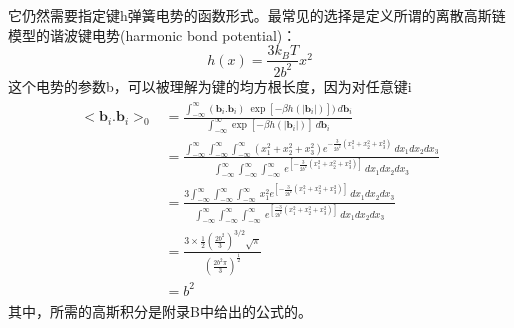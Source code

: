 它仍然需要指定键h弹簧电势的函数形式。最常见的选择是定义所谓的离散高斯链模型的谐波键电势(harmonic bond potential)： 
\begin{equation}\label{2.29}
h(x)=\frac{3k_{B}T}{2b^2} x^2  
\end{equation}
这个电势的参数b，可以被理解为键的均方根长度，因为对任意键i 
\begin{align}\label{2.30}
\begin{split}
<\mathbf{b}_{i}.\mathbf{b}_{i}>_{0}&= \frac{\int_{-\infty}^{\infty} (\mathbf{b}_{i}.\mathbf{b}_{i})~\exp[-\beta h(|\mathbf{b}_{i}|)])~d\mathbf{b}_{i}}{\int_{-\infty}^{\infty} \exp[-\beta h(|\mathbf{b}_{i}|)]~d\mathbf{b}_{i}}\\ &=\frac{\int_{-\infty}^{\infty}\int_{-\infty}^{\infty}\int_{-\infty}^{\infty}(x_1^2+x_2^2+x_3^2)e^{-\frac{3}{2b^2}(x_1^2+x_2^2+x_3^2)}~dx_1dx_2dx_3}{\int_{-\infty}^{\infty}\int_{-\infty}^{\infty}\int_{-\infty}^{\infty}~e^{[-\frac{3}{2b^2}(x_1^2+x_2^2+x_3^2)]}~dx_1dx_2dx_3}\\ &=\frac{3\int_{-\infty}^{\infty}\int_{-\infty}^{\infty}\int_{-\infty}^{\infty}~x_1^2e^{[-\frac{3}{2b^2}(x_1^2+x_2^2+x_3^2)]}~dx_1dx_2dx_3}{\int_{-\infty}^{\infty}\int_{-\infty}^{\infty}\int_{-\infty}^{\infty}~e^{[\frac{-3}{2b^2}(x_1^2+x_2^2+x_3^2)]}~dx_1dx_2dx_3}\\ &=\frac{3 \times\frac{1}{2} (\frac{2b^2}{3})^{3/2}\sqrt{\pi}}{(\frac{2b^2\pi}{3})^{\frac{1}{2}}}\\ &=b^2
\end{split}
\end{align}
其中，所需的高斯积分是附录B中给出的公式的。


